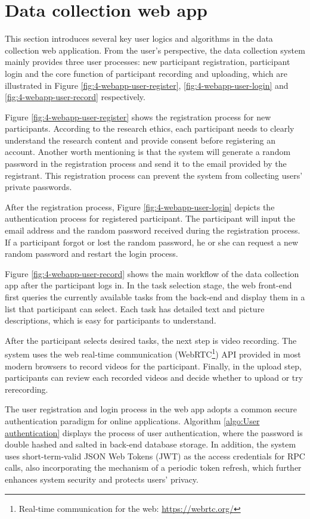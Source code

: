 \section{Data collection web app}
\label{sec:Data collection web app}
This section introduces several key user logics and algorithms in the data collection web application.
From the user's perspective, the data collection system mainly provides three user processes: new participant registration, participant login and the core function of participant recording and uploading, which are illustrated in Figure \ref{fig:4-webapp-user-register}, \ref{fig:4-webapp-user-login} and \ref{fig:4-webapp-user-record} respectively.

Figure \ref{fig:4-webapp-user-register} shows the registration process for new participants.
According to the research ethics, each participant needs to clearly understand the research content and provide consent before registering an account.
Another worth mentioning is that the system will generate a random password in the registration process and send it to the email provided by the registrant.
This registration process can prevent the system from collecting users' private passwords.

After the registration process, Figure \ref{fig:4-webapp-user-login} depicts the authentication process for registered participant.
The participant will input the email address and the random password received during the registration process.
If a participant forgot or lost the random password, he or she can request a new random password and restart the login process.

Figure \ref{fig:4-webapp-user-record} shows the main workflow of the data collection app after the participant logs in.
In the task selection stage, the web front-end first queries the currently available tasks from the back-end and display them in a list that participant can select.
Each task has detailed text and picture descriptions, which is easy for participants to understand.

After the participant selects desired tasks, the next step is video recording.
The system uses the web real-time communication (WebRTC\footnote{Real-time communication for the web: \url{https://webrtc.org/}}) API provided in most modern browsers to record videos for the participant.
Finally, in the upload step, participants can review each recorded videos and decide whether to upload or try rerecording.

The user registration and login process in the web app adopts a common secure authentication paradigm for online applications.
Algorithm \ref{algo:User authentication} displays the process of user authentication, where the password is double hashed and salted in back-end database storage.
In addition, the system uses short-term-valid JSON Web Tokens (JWT) as the access credentials for RPC calls, also incorporating the mechanism of a periodic token refresh, which further enhances system security and protects users' privacy.


